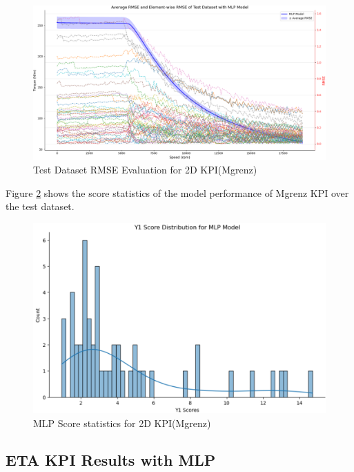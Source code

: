 \documentclass{report} %
\begin{document}
\begin{figure}[H]
    \centering
    \includegraphics[width=1\textwidth]{./ReportImages/avgrmse_y1_mlp.png} 
    \caption{Test Dataset \ac{RMSE} Evaluation for 2D KPI(Mgrenz)} 
    \label{fig:Test Dataset RMSE Evaluation for 2D KPI(Mgrenz)}
\end{figure}

Figure \ref{fig:MLP Score statistics for 2D KPI(Mgrenz)} shows the score statistics of the model performance of Mgrenz \ac{KPI} over the test dataset.\\

\begin{figure}[H]
    \centering
    \includegraphics[width=1\textwidth]{./ReportImages/score_mlp_y1.png} 
    \caption{MLP Score statistics for 2D KPI(Mgrenz)} 
    \label{fig:MLP Score statistics for 2D KPI(Mgrenz)}
\end{figure}

\subsection{ETA \ac{KPI} Results with \ac{MLP}}\label{sec:3D ETA Grid Results with MLP}
\end{document}
